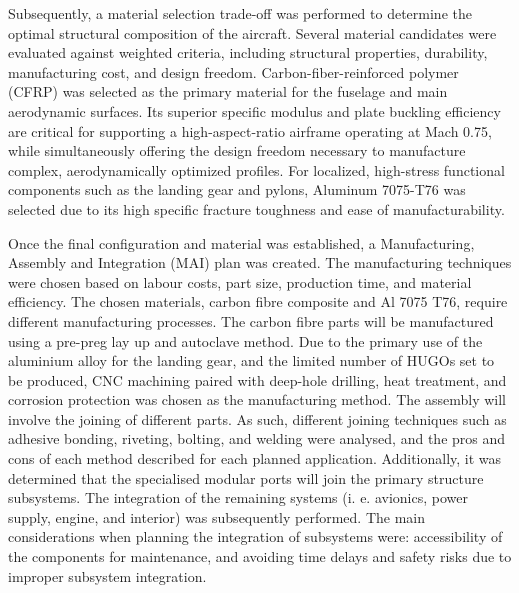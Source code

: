 Subsequently, a material selection trade-off was performed to determine the optimal structural composition of the aircraft. Several material candidates were evaluated against weighted criteria, including structural properties, durability, manufacturing cost, and design freedom. Carbon-fiber-reinforced polymer (CFRP) was selected as the primary material for the fuselage and main aerodynamic surfaces. Its superior specific modulus and plate buckling efficiency are critical for supporting a high-aspect-ratio airframe operating at Mach 0.75, while simultaneously offering the design freedom necessary to manufacture complex, aerodynamically optimized profiles. For localized, high-stress functional components such as the landing gear and pylons, Aluminum 7075-T76 was selected due to its high specific fracture toughness and ease of manufacturability.



Once the final configuration and material was established, a Manufacturing, Assembly and Integration (MAI) plan was created. The manufacturing techniques were chosen based on labour costs, part size, production time, and material efficiency. The chosen materials, carbon fibre composite and Al 7075 T76, require different manufacturing processes. The carbon fibre parts will be manufactured using a pre-preg lay up and autoclave method. Due to the primary use of the aluminium alloy for the landing gear, and the limited number of HUGOs set to be produced, CNC machining paired with deep-hole drilling, heat treatment, and corrosion protection was chosen as the manufacturing method. The assembly will involve the joining of different parts. As such, different joining techniques such as adhesive bonding, riveting, bolting, and welding were analysed, and the pros and cons of each method described for each planned application. Additionally, it was determined that the specialised modular ports will join the primary structure subsystems. The integration of the remaining systems (i. e. avionics, power supply, engine, and interior) was subsequently performed. The main considerations when planning the integration of subsystems were: accessibility of the components for maintenance, and avoiding time delays and safety risks due to improper subsystem integration.

